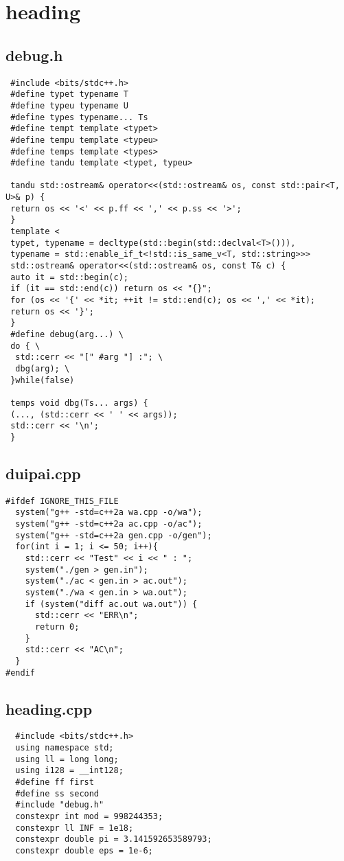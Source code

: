 \documentclass[UTF8, a4paper, titlepage, twoside]{ctexart}
\begin{document}
\clearpage
\section{heading}
\subsection{debug.h}
\begin{verbatim}
 #include <bits/stdc++.h>
 #define typet typename T
 #define typeu typename U
 #define types typename... Ts
 #define tempt template <typet>
 #define tempu template <typeu>
 #define temps template <types>
 #define tandu template <typet, typeu>

 tandu std::ostream& operator<<(std::ostream& os, const std::pair<T, U>& p) {
 return os << '<' << p.ff << ',' << p.ss << '>';
 } 
 template <
 typet, typename = decltype(std::begin(std::declval<T>())),
 typename = std::enable_if_t<!std::is_same_v<T, std::string>>>
 std::ostream& operator<<(std::ostream& os, const T& c) {
 auto it = std::begin(c);
 if (it == std::end(c)) return os << "{}";
 for (os << '{' << *it; ++it != std::end(c); os << ',' << *it);
 return os << '}';
 }
 #define debug(arg...) \
 do { \
  std::cerr << "[" #arg "] :"; \
  dbg(arg); \
 }while(false)

 temps void dbg(Ts... args) {
 (..., (std::cerr << ' ' << args));
 std::cerr << '\n';
 }

\end{verbatim}

\subsection{duipai.cpp}
\begin{verbatim}
#ifdef IGNORE_THIS_FILE
  system("g++ -std=c++2a wa.cpp -o/wa");
  system("g++ -std=c++2a ac.cpp -o/ac");
  system("g++ -std=c++2a gen.cpp -o/gen");
  for(int i = 1; i <= 50; i++){
    std::cerr << "Test" << i << " : ";
    system("./gen > gen.in");
    system("./ac < gen.in > ac.out");
    system("./wa < gen.in > wa.out");
    if (system("diff ac.out wa.out")) {
      std::cerr << "ERR\n";
      return 0;
    }
    std::cerr << "AC\n";
  }
#endif  
\end{verbatim}

\subsection{heading.cpp}
\begin{verbatim}
  #include <bits/stdc++.h>
  using namespace std;
  using ll = long long;
  using i128 = __int128;
  #define ff first
  #define ss second
  #include "debug.h"
  constexpr int mod = 998244353;
  constexpr ll INF = 1e18;
  constexpr double pi = 3.141592653589793;
  constexpr double eps = 1e-6;


\end{verbatim}
\end{document}
